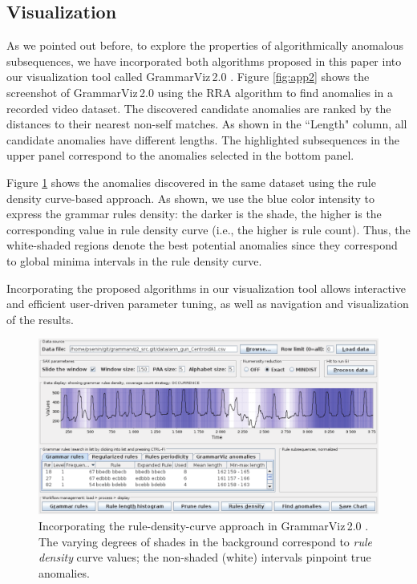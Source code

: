 \documentclass{sig-alternate}
\begin{document}
\subsection{Visualization}
As we pointed out before, to explore the properties of algorithmically anomalous subsequences, we have incorporated both algorithms proposed in this paper into our visualization tool called GrammarViz\,2.0 \cite{grammarviz2}. Figure \ref{fig:app2} shows the screenshot of GrammarViz\,2.0 using the RRA algorithm to find anomalies in a recorded video dataset. The discovered candidate anomalies are ranked by the distances to their nearest non-self matches. As shown in the ``Length" column, all candidate anomalies have different lengths. The highlighted subsequences in the upper panel correspond to the anomalies selected in the bottom panel.

Figure \ref{fig:app} shows the anomalies discovered in the same dataset using the rule density curve-based approach. As shown, we use the blue color intensity to express the grammar rules density: the darker is the shade, the higher is the corresponding value in rule density curve (i.e., the higher is rule count). Thus, the white-shaded regions denote the best potential anomalies since they correspond to global minima intervals in the rule density curve. 

Incorporating the proposed algorithms in our visualization tool allows interactive and efficient user-driven parameter tuning, as well as navigation and visualization of the results.

\begin{figure}[t]
   \centering
   \includegraphics[width=\textwidth]{VideoData.pdf}
   \caption{Incorporating the rule-density-curve approach in GrammarViz\,2.0 \cite{grammarviz2}. The varying degrees of shades in the background correspond to \textit{rule density} curve values; the non-shaded (white) intervals pinpoint true anomalies.}
   \label{fig:app}
\end{figure}
\end{document}
